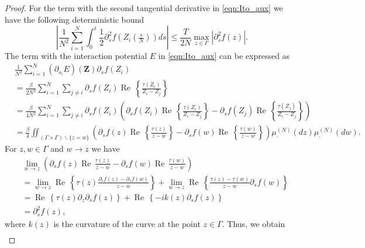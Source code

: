 \documentclass[11pt]{article}
\renewcommand{\Re}{\operatorname{Re}\,}
\renewcommand{\Im}{\operatorname{Im}\,}
\numberwithin{equation}{section}
\theoremstyle{definition}
\begin{document}
\begin{proof}
For the term with the second tangential derivative in \eqref{eqn:Ito_aux} we have the following deterministic bound
\begin{equation}\label{eqn:aux2}
\left|\frac{1}{N^2}\sum_{i=1}^{N}\int_{0}^{t}\frac{1}{2}\partial_s^2 f(Z_i(\tfrac{s}{N}))ds\right|\le \frac{T}{2N}\max_{z\in\Gamma}\left|\partial_s^2 f(z)\right|.
\end{equation}
The term with the interaction potential $E$ in \eqref{eqn:Ito_aux}  can be expressed as 
\begin{align*}
    &\frac{1}{N^{2}}\sum\limits_{i=1}^{N}(\partial_{s_i}E)(\boldsymbol{Z})\partial_s f(Z_i) \\
    &= \frac{\beta}{2N^{2}}\sum_{i=1}^N \sum_{j \neq i}\partial_{s}f(Z_{i})\Re\left\{\frac{\tau(Z_{i})}{Z_{i}-Z_{j}}\right\}\\
    &=\frac{\beta}{4N^{2}}\sum_{i=1}^N \sum_{j \neq i}\partial_{s}f(Z_{i})\left(\partial_{s}f(Z_{i})\Re\left\{\frac{\tau(Z_{i})}{Z_{i}-Z_{j}}\right\}-\partial_{s}f(Z_{j})\Re\left\{\frac{\tau(Z_{j})}{Z_{i}-Z_{j}}\right\}\right)\\
    &= \frac{\beta}{4} \iint_{(\Gamma\times\Gamma ) \smallsetminus \{z=w\}}\left(\partial_{s}f(z)\Re\left\{\frac{\tau(z)}{z-w}\right\}-\partial_{s}f(w)\Re\left\{\frac{\tau(w)}{z-w}\right\}\right)\mu^{(N)}_{\cdot}(dz)\mu^{(N)}_{\cdot}(dw).
\end{align*}
For $z,w\in \Gamma$ and $w\to z$ we have 
\begin{align}\label{eq::diagonal_first_line}
    &\lim_{w\to z}\left(\partial_{s}f(z)\Re\frac{\tau(z)}{z-w} - \partial_{s}f(w)\Re\frac{\tau(w)}{z-w}\right)\\
    &=\lim_{w\to z}\Re\left\{\tau(z)\frac{\partial_{s}f(z)-\partial_{s}f(w)}{z-w}\right\}
    +\lim_{w\to z}\Re\left\{\frac{\tau(z)-\tau(w)}{z-w}\partial_{s}f(w)\right\} \\
    &= \Re\left\{\tau(z)\partial_{z}\partial_{s}f(z)\right\} + \Re\left\{-ik(z)\partial_{s}f(z)\right\}\\
    &= \partial_{s}^{2}f(z),\label{eq::diagonal_last_line}
\end{align}
where $k(z)$ is the curvature of the curve at the point $z\in\Gamma$.
Thus, we obtain
\begin{align}\label{eqn:aux3}

\end{align}
\end{proof}
\end{document}
